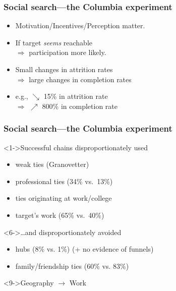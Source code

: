 \begin{frame}
  \frametitle{Social search---the Columbia experiment}


  \begin{itemize}
  \item<1->  
    Motivation/Incentives/Perception matter.
  \item<2->  
    If target \textit{seems} reachable\\
    $\Rightarrow$ participation more likely.
  \item<3->  
    Small changes in attrition rates\\
    $\Rightarrow$ large changes in completion rates
  \item<4->  
    e.g., $\searrow$ 15\% in attrition rate \\
    $\Rightarrow$ $\nearrow$ 800\% in completion rate
  \end{itemize}

\end{frame}



\begin{frame}
  \frametitle{Social search---the Columbia experiment}

  \begin{block}<1->{Successful chains disproportionately used}
    \begin{itemize}
    \item<2-> 
      weak ties (Granovetter)
    \item<3-> 
      professional ties (34\% vs.\ 13\%)
    \item<4-> 
      ties originating at work/college
    \item<5-> 
      target's work (65\% vs.\ 40\%)
    \end{itemize}
  \end{block}
  
  \begin{block}<6->{\ldots and disproportionately avoided}
    \begin{itemize}
    \item<7-> 
      hubs (8\% vs. 1\%) (+ no evidence of funnels)
    \item<8->
      family/friendship ties (60\% vs. 83\%)
    \end{itemize}
  \end{block}

  \begin{block}<9->{Geography $\rightarrow$ Work}
  \end{block}  

\end{frame}


